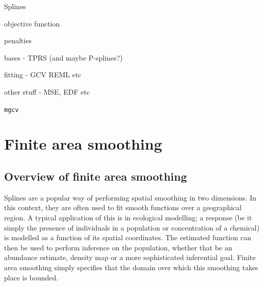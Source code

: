 \bi
\item Splines
\item objective function
\label{GAMobjfcn}
\item penalties
\label{GAMpenalties}
\item bases - TPRS (and maybe P-splines?)
\item fitting - GCV REML etc
\item other stuff - MSE, EDF etc
\item \texttt{mgcv}
%	
%	
%
\ei

\section{Finite area smoothing}

\subsection{Overview of finite area smoothing}

Splines are a popular way of performing spatial smoothing in two dimensions. In this context, they are often used to fit smooth functions over a geographical region. A typical application of this is in ecological modelling; a response (be it simply the presence of individuals in a population or concentration of a chemical) is modelled as a function of its spatial coordinates. The estimated function can then be used to perform inference on the population, whether that be an abundance estimate, density map or a more sophisticated inferential goal. Finite area smoothing simply specifies that the domain over which this smoothing takes place is bounded.


